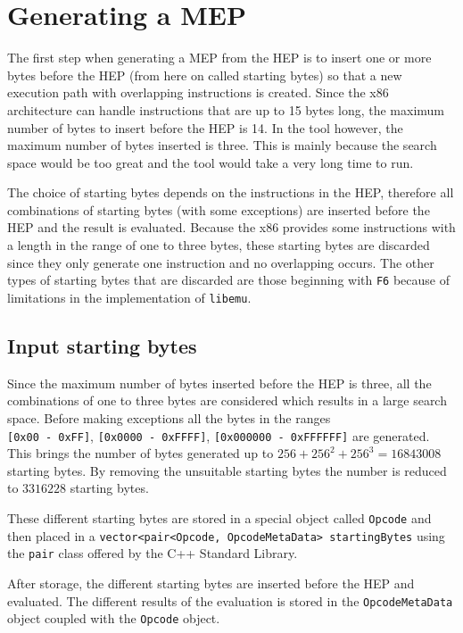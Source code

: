 \documentclass[11pt,twoside]{eitExjobb}
\begin{document}
\section{Generating a MEP}
The first step when generating a MEP from the HEP is to insert one or more bytes before the HEP (from here on called starting bytes) so that a new execution path with overlapping instructions is created. Since the x86 architecture can handle instructions that are up to 15 bytes long, the maximum number of bytes to insert before the HEP is 14. In the tool however, the maximum number of bytes inserted is three. This is mainly because the search space would be too great and the tool would take a very long time to run. 

The choice of starting bytes depends on the instructions in the HEP, therefore all combinations of starting bytes (with some exceptions) are inserted before the HEP and the result is evaluated. Because the x86 provides some instructions with a length in the range of one to three bytes, these starting bytes are discarded since they only generate one instruction and no overlapping occurs. The other types of starting bytes that are discarded are those beginning with \texttt{F6} because of limitations in the implementation of \texttt{libemu}.


\subsection{Input starting bytes}
Since the maximum number of bytes inserted before the HEP is three, all the combinations of one to three bytes are considered which results in a large search space. Before making exceptions all the bytes in the ranges\\ 
\texttt{[0x00 - 0xFF]}, \texttt{[0x0000 - 0xFFFF]}, \texttt{[0x000000 - 0xFFFFFF]} are generated. This brings the number of bytes generated up to $256 + 256^2 + 256^3 = 16843008$ starting bytes. By removing the unsuitable starting bytes the number is reduced to $3316228$ starting bytes.

These different starting bytes are stored in a special object called \texttt{Opcode} and then placed in a \texttt{vector<pair<Opcode, OpcodeMetaData> startingBytes} using the \texttt{pair} class offered by the C++ Standard Library.

After storage, the different starting bytes are inserted before the HEP and evaluated. The different results of the evaluation is stored in the \texttt{OpcodeMetaData} object coupled with the \texttt{Opcode} object. 
\end{document}
